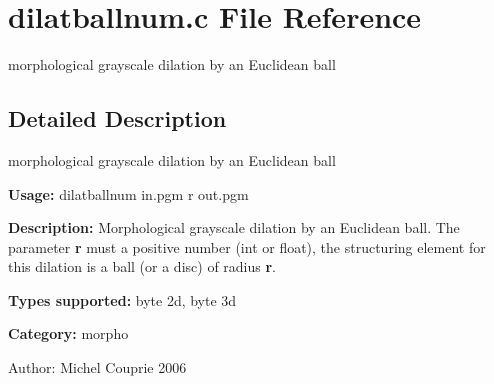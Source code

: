 \section{dilatballnum.c File Reference}
\label{dilatballnum_8c}
morphological grayscale dilation by an Euclidean ball 



\subsection{Detailed Description}
morphological grayscale dilation by an Euclidean ball 

{\bf Usage:} dilatballnum in.pgm r out.pgm

{\bf Description:} Morphological grayscale dilation by an Euclidean ball. The parameter {\bf r} must a positive number (int or float), the structuring element for this dilation is a ball (or a disc) of radius {\bf r}.

{\bf Types supported:} byte 2d, byte 3d

{\bf Category:} morpho

\begin{Desc}
\item[Author:]Michel Couprie 2006 \end{Desc}
